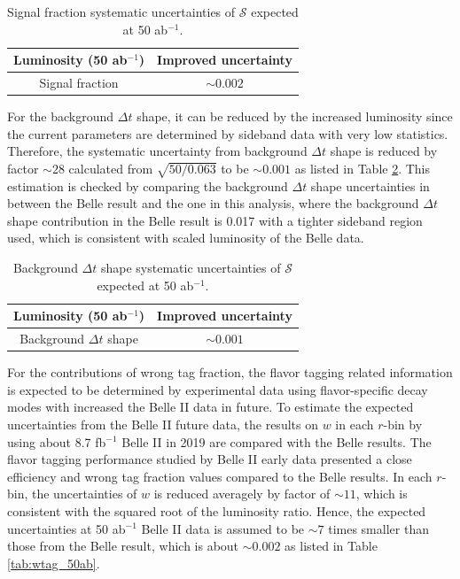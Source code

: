 \begin{table}[htpb]
	\centering
	\caption{ Signal fraction systematic uncertainties of $\mathcal{S}$ expected at 50 ab$^{-1}$.}
	\label{tab:sig_f}
	\begin{tabular}{c| c}
		\hline
		Luminosity (50 ab$^{-1}$) & Improved uncertainty \\
		\hline
		Signal fraction &  $\sim0.002$ \\
		\hline
	\end{tabular}
\end{table}

For the background $\Delta t$ shape, it can be reduced by the increased luminosity since the current parameters are determined by sideband data with very low statistics. Therefore, the systematic uncertainty from background $\Delta t$ shape is reduced by factor $\sim 28$ calculated from $\sqrt{50/0.063}$ to be $\sim 0.001$ as listed in Table \ref{tab:bkg_shape}. This estimation is checked by comparing the background $\Delta t$ shape uncertainties in between the Belle result and the one in this analysis, where the background $\Delta t$ shape contribution in the Belle  result is 0.017\cite{kang2020measurement} with a tighter sideband region used, which is consistent with scaled luminosity of the Belle data. 

\begin{table}[htpb]
	\centering
	\caption{ Background $\Delta t$ shape systematic uncertainties of $\mathcal{S}$ expected at 50 ab$^{-1}$.}
	\label{tab:bkg_shape}
	\begin{tabular}{c| c}
		\hline
		Luminosity (50 ab$^{-1}$) & Improved uncertainty \\
		\hline
		Background $\Delta t$ shape &  $\sim0.001$ \\
		\hline
	\end{tabular}
\end{table}

For the contributions of wrong tag fraction, the flavor tagging related information is expected to be determined by experimental data using flavor-specific decay modes with increased the Belle II data in future. To estimate the expected uncertainties from the Belle II future data, the results on $w$ in each $r$-bin by using about 8.7 fb$^{-1}$ Belle II in 2019 are compared with the Belle results\cite{abudinen2020first}. The flavor tagging performance studied by Belle II early data presented a close efficiency and wrong tag fraction values compared to the Belle results. In each $r$-bin, the uncertainties of $w$ is reduced averagely by factor of $\sim 11$, which is consistent with the squared root of the luminosity ratio. Hence, the expected uncertainties at 50 ab$^{-1}$ Belle II data is assumed to be $\sim 7$ times smaller than those from the Belle result\cite{kang2020measurement}, which is about $\sim0.002$ as listed in Table \ref{tab:wtag_50ab}.

